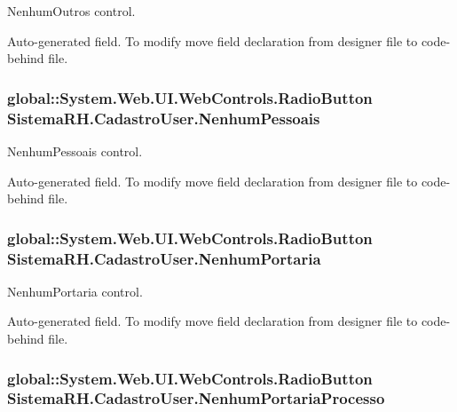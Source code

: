 NenhumOutros control. 

Auto-\/generated field. To modify move field declaration from designer file to code-\/behind file. \hypertarget{class_sistema_r_h_1_1_cadastro_user_ac6a633e5e73cd93d92f3c269ee98b678}{
\subsubsection[{NenhumPessoais}]{\setlength{\rightskip}{0pt plus 5cm}global::System.Web.UI.WebControls.RadioButton {\bf SistemaRH.CadastroUser.NenhumPessoais}}}
\label{class_sistema_r_h_1_1_cadastro_user_ac6a633e5e73cd93d92f3c269ee98b678}


NenhumPessoais control. 

Auto-\/generated field. To modify move field declaration from designer file to code-\/behind file. \hypertarget{class_sistema_r_h_1_1_cadastro_user_a0de4c38e7297ba6b7ce80aef864562d5}{
\subsubsection[{NenhumPortaria}]{\setlength{\rightskip}{0pt plus 5cm}global::System.Web.UI.WebControls.RadioButton {\bf SistemaRH.CadastroUser.NenhumPortaria}}}
\label{class_sistema_r_h_1_1_cadastro_user_a0de4c38e7297ba6b7ce80aef864562d5}


NenhumPortaria control. 

Auto-\/generated field. To modify move field declaration from designer file to code-\/behind file. \hypertarget{class_sistema_r_h_1_1_cadastro_user_a4b42684da57180266ab3af8489391f8c}{
\subsubsection[{NenhumPortariaProcesso}]{\setlength{\rightskip}{0pt plus 5cm}global::System.Web.UI.WebControls.RadioButton {\bf SistemaRH.CadastroUser.NenhumPortariaProcesso}}}
\label{class_sistema_r_h_1_1_cadastro_user_a4b42684da57180266ab3af8489391f8c}


